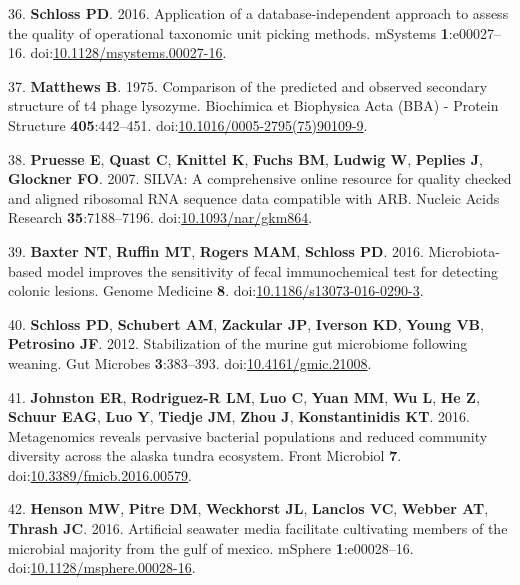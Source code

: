 \documentclass[11pt,]{article}
\begin{document}
\hypertarget{ref-Schloss2016a}{}
36. \textbf{Schloss PD}. 2016. Application of a database-independent
approach to assess the quality of operational taxonomic unit picking
methods. mSystems \textbf{1}:e00027--16.
doi:\href{https://doi.org/10.1128/msystems.00027-16}{10.1128/msystems.00027-16}.

\hypertarget{ref-Matthews1975}{}
37. \textbf{Matthews B}. 1975. Comparison of the predicted and observed
secondary structure of t4 phage lysozyme. Biochimica et Biophysica Acta
(BBA) - Protein Structure \textbf{405}:442--451.
doi:\href{https://doi.org/10.1016/0005-2795(75)90109-9}{10.1016/0005-2795(75)90109-9}.

\hypertarget{ref-Pruesse2007}{}
38. \textbf{Pruesse E}, \textbf{Quast C}, \textbf{Knittel K},
\textbf{Fuchs BM}, \textbf{Ludwig W}, \textbf{Peplies J},
\textbf{Glockner FO}. 2007. SILVA: A comprehensive online resource for
quality checked and aligned ribosomal RNA sequence data compatible with
ARB. Nucleic Acids Research \textbf{35}:7188--7196.
doi:\href{https://doi.org/10.1093/nar/gkm864}{10.1093/nar/gkm864}.

\hypertarget{ref-Baxter2016}{}
39. \textbf{Baxter NT}, \textbf{Ruffin MT}, \textbf{Rogers MAM},
\textbf{Schloss PD}. 2016. Microbiota-based model improves the
sensitivity of fecal immunochemical test for detecting colonic lesions.
Genome Medicine \textbf{8}.
doi:\href{https://doi.org/10.1186/s13073-016-0290-3}{10.1186/s13073-016-0290-3}.

\hypertarget{ref-Schloss2012}{}
40. \textbf{Schloss PD}, \textbf{Schubert AM}, \textbf{Zackular JP},
\textbf{Iverson KD}, \textbf{Young VB}, \textbf{Petrosino JF}. 2012.
Stabilization of the murine gut microbiome following weaning. Gut
Microbes \textbf{3}:383--393.
doi:\href{https://doi.org/10.4161/gmic.21008}{10.4161/gmic.21008}.

\hypertarget{ref-Johnston2016}{}
41. \textbf{Johnston ER}, \textbf{Rodriguez-R LM}, \textbf{Luo C},
\textbf{Yuan MM}, \textbf{Wu L}, \textbf{He Z}, \textbf{Schuur EAG},
\textbf{Luo Y}, \textbf{Tiedje JM}, \textbf{Zhou J},
\textbf{Konstantinidis KT}. 2016. Metagenomics reveals pervasive
bacterial populations and reduced community diversity across the alaska
tundra ecosystem. Front Microbiol \textbf{7}.
doi:\href{https://doi.org/10.3389/fmicb.2016.00579}{10.3389/fmicb.2016.00579}.

\hypertarget{ref-Henson2016}{}
42. \textbf{Henson MW}, \textbf{Pitre DM}, \textbf{Weckhorst JL},
\textbf{Lanclos VC}, \textbf{Webber AT}, \textbf{Thrash JC}. 2016.
Artificial seawater media facilitate cultivating members of the
microbial majority from the gulf of mexico. mSphere
\textbf{1}:e00028--16.
doi:\href{https://doi.org/10.1128/msphere.00028-16}{10.1128/msphere.00028-16}.
\end{document}
